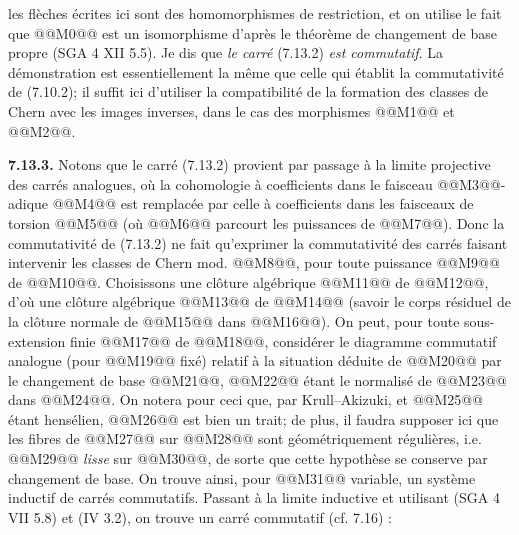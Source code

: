 
les
flèches écrites ici sont des homomorphismes de restriction, et on utilise le fait que @@M0@@ est un isomorphisme d'après le théorème de changement de base propre (SGA 4 XII 5.5). Je dis que \emph{le carré} (7.13.2) \emph{est commutatif}. La démonstration est essentiellement la même que celle qui établit la commutativité de (7.10.2); il suffit ici d'utiliser la compatibilité de la formation des classes de Chern avec les images inverses, dans le cas des morphismes @@M1@@ et @@M2@@.

\textbf{7.13.3.} Notons que le carré (7.13.2) provient par passage à la limite projective des carrés analogues, où la cohomologie à coefficients dans le faisceau @@M3@@-adique @@M4@@ est remplacée par celle à coefficients dans les faisceaux de torsion @@M5@@ (où @@M6@@ parcourt les puissances de @@M7@@). Donc la commutativité de (7.13.2) ne fait qu'exprimer la commutativité des carrés faisant intervenir les classes de Chern mod. @@M8@@, pour toute puissance @@M9@@ de @@M10@@. Choisissons une clôture algébrique @@M11@@ de @@M12@@, d'où une clôture algébrique @@M13@@ de @@M14@@ (savoir le corps résiduel de la clôture normale de @@M15@@ dans @@M16@@). On peut, pour toute sous-extension finie @@M17@@ de @@M18@@, considérer le diagramme commutatif analogue (pour @@M19@@ fixé) relatif à la situation déduite de @@M20@@ par le changement de base @@M21@@, @@M22@@ étant le normalisé de @@M23@@ dans @@M24@@. On notera pour ceci que, par Krull--Akizuki, et @@M25@@ étant hensélien, @@M26@@ est bien un trait; de plus, il faudra supposer ici que les fibres de @@M27@@ sur @@M28@@ sont géométriquement régulières, i.e. @@M29@@ \emph{lisse} sur @@M30@@, de sorte que cette hypothèse se conserve par changement de base. On trouve ainsi, pour @@M31@@ variable, un système inductif de carrés commutatifs. Passant à la limite inductive et utilisant (SGA 4 VII 5.8) et (IV 3.2), on trouve un carré commutatif (cf. 7.16) :

